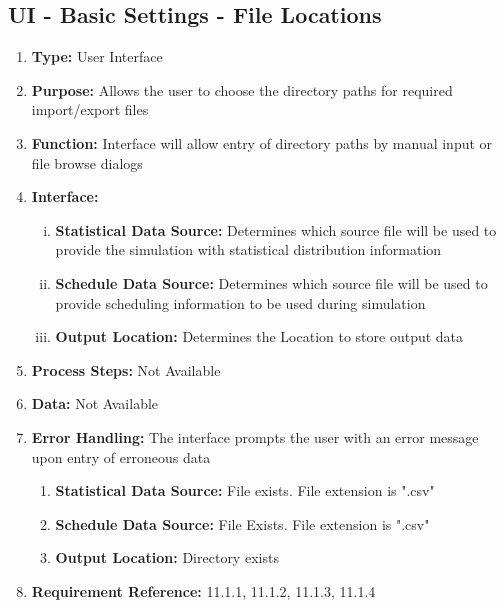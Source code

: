\documentclass[paper=letter, fontsize=10pt]{scrartcl}
\numberwithin{equation}{section}		%
\numberwithin{figure}{section}			%
\numberwithin{table}{section}				%
\begin{document}
\subsection{UI - Basic Settings - File Locations}
\begin{enumerate}[]
	\item \textbf{Type:} User Interface
	\item \textbf{Purpose:} Allows the user to choose the directory paths for required import/export files
	\item \textbf{Function:} Interface will allow entry of directory paths by manual input or file browse dialogs
	\item \textbf{Interface:}  
	\begin{enumerate}[(i)]
		\item \textbf{Statistical Data Source:} Determines which source file will be used to provide the simulation with statistical distribution information
		\item \textbf{Schedule Data Source:} Determines which source file will be used to provide scheduling information to be used during simulation
		\item \textbf{Output Location:} Determines the Location to store output data
	\end{enumerate}
	\item \textbf{Process Steps:} Not Available
	\item \textbf{Data:} Not Available
	\item \textbf{Error Handling:} The interface prompts the user with an error message upon entry of erroneous data
	\begin{enumerate}[]
		\item \textbf{Statistical Data Source:} File exists. File extension is ".csv"
		\item \textbf{Schedule Data Source:} File Exists. File extension is ".csv"
		\item \textbf{Output Location:} Directory exists
	\end{enumerate}
	\item \textbf{Requirement Reference:} 11.1.1, 11.1.2, 11.1.3, 11.1.4
\end{enumerate}
\end{document}
